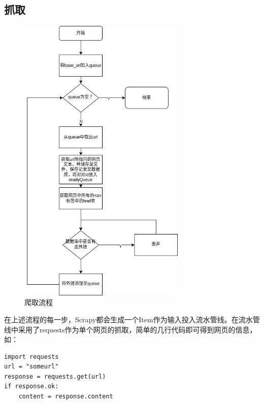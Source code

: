 \documentclass{article}
\begin{document}
\begin{CJK*}{UTF8}{gbsn}
\subsection{抓取}
\begin{figure}[H]
\centering
\includegraphics[width=8cm]{spider_flow.drawio.png}
\caption{爬取流程}
\end{figure}
在上述流程的每一步，Scrapy都会生成一个Item作为输入投入流水管线。在流水管线中采用了requests作为单个网页的抓取，简单的几行代码即可得到网页的信息，如：
\begin{lstlisting}
import requests
url = "someurl"
response = requests.get(url)
if response.ok:
	content = response.content 
\end{lstlisting}

\end{CJK*}
\end{document}
